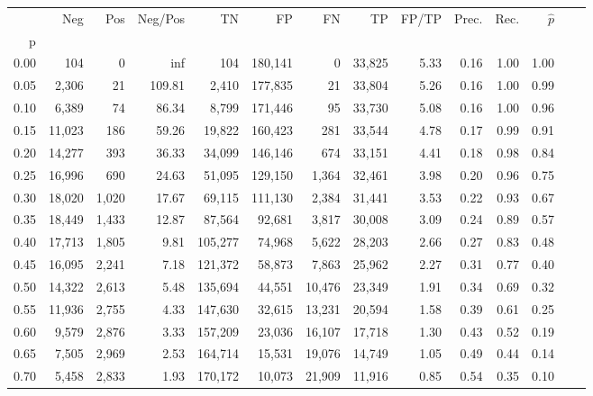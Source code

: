 \begin{tabular}{rrrrrrrrrrrrrr}
\toprule
{} &     Neg &    Pos & Neg/Pos &       TN &       FP &      FN &      TP & FP/TP & Prec. &  Rec. & $\hat{p}$ \\
p    &         &        &         &          &          &         &         &       &       &       &           \\
\midrule
0.00 &     104 &      0 &     inf &      104 &  180,141 &       0 &  33,825 &  5.33 &  0.16 &  1.00 &      1.00 \\
0.05 &   2,306 &     21 &  109.81 &    2,410 &  177,835 &      21 &  33,804 &  5.26 &  0.16 &  1.00 &      0.99 \\
0.10 &   6,389 &     74 &   86.34 &    8,799 &  171,446 &      95 &  33,730 &  5.08 &  0.16 &  1.00 &      0.96 \\
0.15 &  11,023 &    186 &   59.26 &   19,822 &  160,423 &     281 &  33,544 &  4.78 &  0.17 &  0.99 &      0.91 \\
0.20 &  14,277 &    393 &   36.33 &   34,099 &  146,146 &     674 &  33,151 &  4.41 &  0.18 &  0.98 &      0.84 \\
0.25 &  16,996 &    690 &   24.63 &   51,095 &  129,150 &   1,364 &  32,461 &  3.98 &  0.20 &  0.96 &      0.75 \\
0.30 &  18,020 &  1,020 &   17.67 &   69,115 &  111,130 &   2,384 &  31,441 &  3.53 &  0.22 &  0.93 &      0.67 \\
0.35 &  18,449 &  1,433 &   12.87 &   87,564 &   92,681 &   3,817 &  30,008 &  3.09 &  0.24 &  0.89 &      0.57 \\
0.40 &  17,713 &  1,805 &    9.81 &  105,277 &   74,968 &   5,622 &  28,203 &  2.66 &  0.27 &  0.83 &      0.48 \\
0.45 &  16,095 &  2,241 &    7.18 &  121,372 &   58,873 &   7,863 &  25,962 &  2.27 &  0.31 &  0.77 &      0.40 \\
0.50 &  14,322 &  2,613 &    5.48 &  135,694 &   44,551 &  10,476 &  23,349 &  1.91 &  0.34 &  0.69 &      0.32 \\
0.55 &  11,936 &  2,755 &    4.33 &  147,630 &   32,615 &  13,231 &  20,594 &  1.58 &  0.39 &  0.61 &      0.25 \\
0.60 &   9,579 &  2,876 &    3.33 &  157,209 &   23,036 &  16,107 &  17,718 &  1.30 &  0.43 &  0.52 &      0.19 \\
0.65 &   7,505 &  2,969 &    2.53 &  164,714 &   15,531 &  19,076 &  14,749 &  1.05 &  0.49 &  0.44 &      0.14 \\
0.70 &   5,458 &  2,833 &    1.93 &  170,172 &   10,073 &  21,909 &  11,916 &  0.85 &  0.54 &  0.35 &      0.10 \\

\end{tabular}
